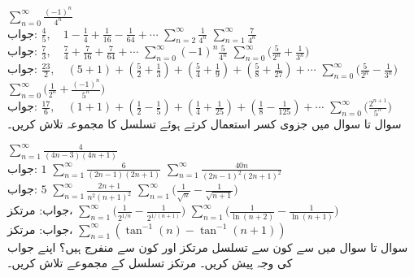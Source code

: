 $\sum\limits_{n=0}^{\infty}\frac{(-1)^n}{4^n}$\\
جواب:\quad
$\tfrac{4}{5},\quad 1-\tfrac{1}{4}+\tfrac{1}{16}-\tfrac{1}{64}+\cdots$
$\sum\limits_{n=2}^{\infty}\frac{1}{4^n}$
$\sum\limits_{n=1}^{\infty}\frac{7}{4^n}$\\
جواب:\quad
$\tfrac{7}{3},\quad \tfrac{7}{4}+\tfrac{7}{16}+\tfrac{7}{64}+\cdots$
$\sum\limits_{n=0}^{\infty}(-1)^n\frac{5}{4^n}$
$\sum\limits_{n=0}^{\infty}\big(\frac{5}{2^n}+\frac{1}{3^n}\big)$\\
جواب:\quad
$\tfrac{23}{2},\quad (5+1)+(\tfrac{5}{2}+\tfrac{1}{3})+(\tfrac{5}{4}+\tfrac{1}{9})+(\tfrac{5}{8}+\tfrac{1}{27})+\cdots$
$\sum\limits_{n=0}^{\infty}\big(\frac{5}{2^n}-\frac{1}{3^n}\big)$
$\sum\limits_{n=0}^{\infty}\big(\frac{1}{2^n}+\frac{(-1)^n}{5^n}\big)$\\
جواب:\quad
$\tfrac{17}{6},\quad (1+1)+(\tfrac{1}{2}-\tfrac{1}{5})+(\tfrac{1}{4}+\tfrac{1}{25})+(\tfrac{1}{8}-\tfrac{1}{125})+\cdots$
$\sum\limits_{n=0}^{\infty}\big(\frac{2^{n+1}}{5^n}\big)$
\\
سوال  تا سوال  میں جزوی کسر استعمال کرتے ہوئے تسلسل کا مجموعہ تلاش کریں۔

$\sum\limits_{n=1}^{\infty}\frac{4}{(4n-3)(4n+1)}$\\
جواب:\quad
$1$
$\sum\limits_{n=1}^{\infty}\frac{6}{(2n-1)(2n+1)}$
$\sum\limits_{n=1}^{\infty}\frac{40n}{(2n-1)^2(2n+1)^2}$\\
جواب:\quad
$5$
$\sum\limits_{n=1}^{\infty}\frac{2n+1}{n^2(n+1)^2}$
$\sum\limits_{n=1}^{\infty}\big(\frac{1}{\sqrt{n}}-\frac{1}{\sqrt{n+1}}\big)$\\
جواب:\quad
مرتکز، 
$\sum\limits_{n=1}^{\infty}\big(\frac{1}{2^{1/n}}-\frac{1}{2^{1/(n+1)}}\big)$
$\sum\limits_{n=1}^{\infty}\big(\frac{1}{\ln(n+2)}-\frac{1}{\ln(n+1)}\big)$\\
جواب:\quad
مرتکز، 
$\sum\limits_{n=1}^{\infty}(\tan^{-1}(n)-\tan^{-1}(n+1))$
\\
سوال  تا سوال  میں سے کون سے تسلسل مرتکز اور کون سے منفرج ہیں؟ اپنے جواب کی وجہ پیش کریں۔ مرتکز تسلسل کے مجموعے تلاش کریں۔

